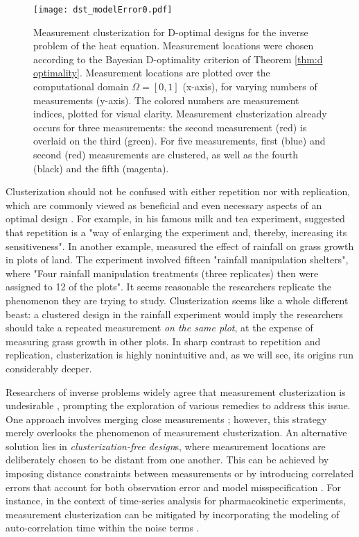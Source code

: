 \begin{figure}
    \centering
    \texttt{[image: dst\_modelError0.pdf]}
    \caption{Measurement clusterization for D-optimal designs for the
      inverse problem of the heat equation. Measurement locations were
      chosen according to the Bayesian D-optimality criterion of
      Theorem \ref{thm:d optimality}. Measurement locations are
      plotted over the computational domain \(\Omega = [0, 1]\)
      (x-axis), for varying numbers of measurements (y-axis). The
      colored numbers are measurement indices, plotted for visual
      clarity. Measurement clusterization already occurs for three
      measurements: the second measurement (red) is overlaid on the
      third (green). For five measurements, first (blue) and second
      (red) measurements are clustered, as well as the fourth (black)
      and the fifth (magenta).}
  \label{fig:clusterization illustration}
\end{figure}


Clusterization should not be confused with either repetition nor with
replication, which are commonly viewed as beneficial and even
necessary aspects of an optimal design \cite{morris, fisher
  schafer2001replication}. For example, in his famous milk and tea
experiment, \cite[Section 11]{fisher} suggested that repetition is a
"way of enlarging the experiment and, thereby, increasing its
sensitiveness". In another example, \cite{fay2000rainfall} measured
the effect of rainfall on grass growth in plots of land. The
experiment involved fifteen "rainfall manipulation shelters", where
"Four rainfall manipulation treatments (three replicates) then were
assigned to 12 of the plots". It seems reasonable the researchers
replicate the phenomenon they are trying to study. Clusterization
seems like a whole different beast: a clustered design in the rainfall
experiment would imply the researchers should take a repeated
measurement \emph{on the same plot}, at the expense of measuring grass
growth in other plots. In sharp contrast to repetition and
replication, clusterization is highly nonintuitive and, as we will
see, its origins run considerably deeper.


Researchers of inverse problems widely agree that measurement
clusterization is undesirable \cite{fedorov1996, nyberg2012,
  fedorov1997, Ucinski05, neitzel2019sparse}, prompting the
exploration of various remedies to address this issue. One approach
involves merging close measurements \cite{fedorov1997}; however, this
strategy merely overlooks the phenomenon of measurement
clusterization. An alternative solution lies in
\emph{clusterization-free design}s, where measurement locations are
deliberately chosen to be distant from one another. This can be
achieved by imposing distance constraints between measurements or by
introducing correlated errors that account for both observation error
and model misspecification \cite{Ucinski05}. For instance, in the
context of time-series analysis for pharmacokinetic experiments,
measurement clusterization can be mitigated by incorporating the
modeling of auto-correlation time within the noise terms
\cite{nyberg2012}.


